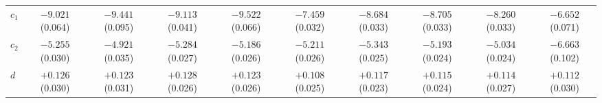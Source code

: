 \begin{landscape}
\begin{table}[p]
\begin{tabular}{lccccccccc}
    \midrule
    $c_1$ & $-9.021$ (0.064) & $-9.441$ (0.095) & $-9.113$ (0.041) & $-9.522$ (0.066) & $-7.459$ (0.032) & $-8.684$ (0.033) & $-8.705$ (0.033) & $-8.260$ (0.033) & $-6.652$ (0.071) \\
    $c_2$ & $-5.255$ (0.030) & $-4.921$ (0.035) & $-5.284$ (0.027) & $-5.186$ (0.026) & $-5.211$ (0.026) & $-5.343$ (0.025) & $-5.193$ (0.024) & $-5.034$ (0.024) & $-6.663$ (0.102) \\
    $d$   & $+0.126$ (0.030) & $+0.123$ (0.031) & $+0.128$ (0.026) & $+0.123$ (0.026) & $+0.108$ (0.025) & $+0.117$ (0.023) & $+0.115$ (0.024) & $+0.114$ (0.027) & $+0.112$ (0.030) \\
    \bottomrule
  \end{tabular}
\end{table}
\end{landscape}
